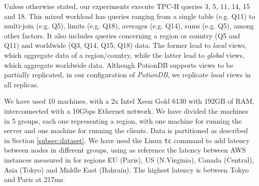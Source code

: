 \documentclass[sigplan,twocolumn,review,anonymous]{acmart}
\begin{document}
Unless otherwise stated, our experiments execute TPC-H queries 3, 5, 11, 14, 15 and 18.
This mixed workload has queries ranging from a single table (e.g. Q11) to multi-join (e.g. Q5), limits (e.g. Q18), averages (e.g. Q14), sums (e.g. Q5), 
among other factors. It also includes queries concerning a region or country (Q5 and Q11) and worldwide (Q3, Q14, Q15, Q18) data.
The former lead to \textit{local} views, which aggregate data of a region/country, while the latter lead to \textit{global} views, which aggregate worldwide data. 
Although PotionDB supports views to be partially replicated, in our configuration of \textit{PotionDB}, we replicate \textit{local} views in all replicas.




We have used 10 machines, with a 2x Intel Xeon Gold 6130 with 192GB of RAM, interconnected with a 10Gbps Ethernet network. 
We have divided the machines in 5 groups,  each one representing a region, with one machine for running the server and one machine for running the clients.  
Data is partitioned as described in Section \ref{subsec:dataset}. 
We have used the Linux \texttt{tc} command to add latency between nodes in different groups, using as reference the latency between AWS instances measured in \cite{AWSLatency} for regions EU (Paris), US (N.Virginia), Canada (Central), Asia (Tokyo) and Middle East (Bahrain). The highest latency is between Tokyo and Paris at 217ms.  
\end{document}
